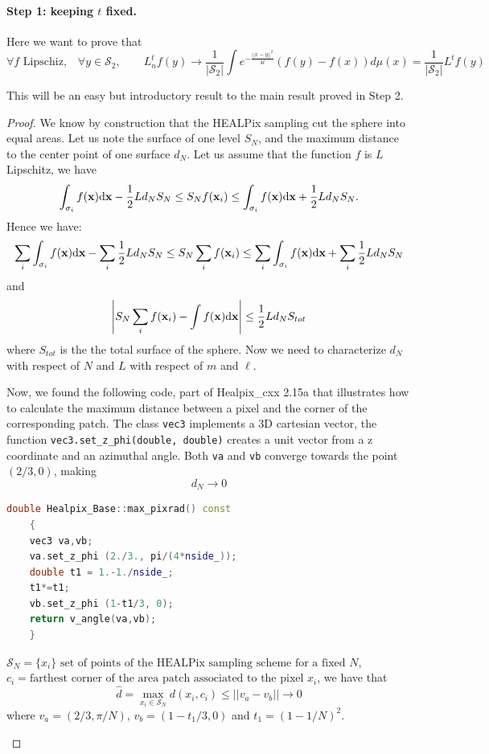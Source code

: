 \paragraph{Step 1: keeping $t$ fixed.}

Here we want to prove that 
$$\forall f \text{ Lipschiz,}\quad \forall y\in\mathcal S_2,  \quad\quad L_n^tf(y)\rightarrow \frac{1}{|\mathcal S_2|}\int e^{-\frac{||x-y||^2}{4t}}\left(f(y)-f(x)\right)d\mu(x) = \frac{1}{|\mathcal S_2|} L^tf(y)$$

This will be an easy but introductory result to the main result proved in Step 2.

\begin{proof}
We know by construction that the HEALPix sampling cut the sphere into equal areas. Let us note the surface of one level $S_N$, and the maximum distance to the center point of one surface\textbf{ $d_{N}$}.
Let us assume that the function $f$ is $L$ Lipschitz, we have
\[
\int_{\sigma_{i}}f({\bf x})\text{d}{\bf x}-\frac{1}{2}Ld_{N}S_{N}\leq S_{N}f({\bf x}_{i})\leq\int_{\sigma_{i}}f({\bf x})\text{d}{\bf x}+\frac{1}{2}Ld_{N}S_{N}.
\]
Hence we have:
\[
\sum_{i}\int_{\sigma_{i}}f({\bf x})\text{d}{\bf x}-\sum_{i}\frac{1}{2}Ld_{N}S_{N}\leq S_{N}\sum_{i}f({\bf x}_{i})\leq\sum_{i}\int_{\sigma_{i}}f({\bf x})\text{d}{\bf x}+\sum_{i}\frac{1}{2}Ld_{N}S_{N}
\]
and 
\[
\left|S_{N}\sum_{i}f({\bf x}_{i})-\int f({\bf x})\text{d}{\bf x}\right|\le\frac{1}{2}Ld_{N}S_{tot}
\]
where $S_{tot}$ is the the total surface of the sphere. Now we need to characterize $d_{N}$ with respect of $N$ and $L$ with respect of $m$ and $\ell$. 


\begin{tcolorbox}
	Now, we found the following code, part of Healpix\_cxx 2.15a \cite{Healpix_cc} that illustrates how to calculate the maximum distance between a pixel and the corner of the corresponding patch. The class \lstinline|vec3| implements a 3D cartesian vector, the function \lstinline|vec3.set_z_phi(double, double)| creates a unit vector from a z coordinate and an azimuthal angle. Both \lstinline|va| and \lstinline|vb| converge towards the point $(2/3, 0)$, making $$d_{N}\rightarrow0$$
	\begin{lstlisting}[language=c++]
	double Healpix_Base::max_pixrad() const
	{
	vec3 va,vb;
	va.set_z_phi (2./3., pi/(4*nside_));
	double t1 = 1.-1./nside_;
	t1*=t1;
	vb.set_z_phi (1-t1/3, 0);
	return v_angle(va,vb);
	}
	\end{lstlisting}
	$\mathcal S_{N} = \{x_i\}  \text{ set of points of the HEALPix sampling scheme for a fixed }N$,\\$c_i = \text{farthest corner of the area patch associated to the pixel }x_i$, we have that 
	$$\hat d=\max_{x_i\in \mathcal S_{N}}d(x_i, c_i) \leq ||v_a-v_b||\rightarrow 0$$
	where $v_a = (2/3, \pi/N)$, $v_b = (1-t_1/3, 0)$ and $t_1=(1-1/N)^2$.
\end{tcolorbox} 


\end{proof}
